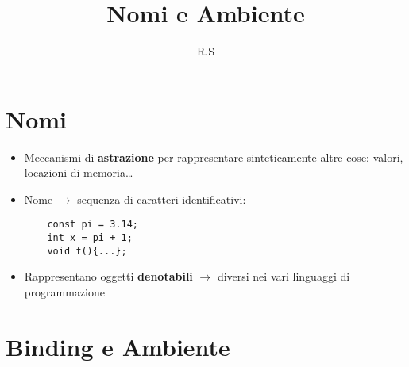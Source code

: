 \documentclass[12pt]{extarticle}
\title{Nomi e Ambiente}
\author{R.S}
\begin{document}
\maketitle

\section*{Nomi}

\begin{itemize}
  \item Meccanismi di \textbf{astrazione} per rappresentare sinteticamente altre cose: valori, locazioni di memoria\dots
  \item Nome $\rightarrow$ sequenza di caratteri identificativi:
  \begin{lstlisting}
    const pi = 3.14;
    int x = pi + 1;
    void f(){...};
  \end{lstlisting}
  \item Rappresentano oggetti \textbf{denotabili} $\rightarrow$ diversi nei vari linguaggi di programmazione
\end{itemize}

\section*{Binding e Ambiente}
\end{document}
